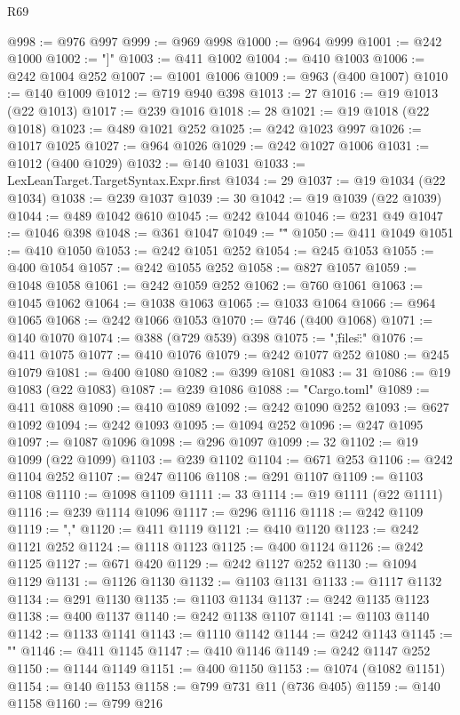 \begin{lexlean}{R69}
\begin{coremodule}
@998 := @976 @997
@999 := @969 @998
@1000 := @964 @999
@1001 := @242 @1000
@1002 := "]"
@1003 := @411 @1002
@1004 := @410 @1003
@1006 := @242 @1004 @252
@1007 := @1001 @1006
@1009 := @963 (@400 @1007)
@1010 := @140 @1009
@1012 := @719 @940 @398
@1013 := 27
@1016 := @19 @1013 (@22 @1013)
@1017 := @239 @1016
@1018 := 28
@1021 := @19 @1018 (@22 @1018)
@1023 := @489 @1021 @252
@1025 := @242 @1023 @997
@1026 := @1017 @1025
@1027 := @964 @1026
@1029 := @242 @1027 @1006
@1031 := @1012 (@400 @1029)
@1032 := @140 @1031
@1033 := LexLeanTarget.TargetSyntax.Expr.first
@1034 := 29
@1037 := @19 @1034 (@22 @1034)
@1038 := @239 @1037
@1039 := 30
@1042 := @19 @1039 (@22 @1039)
@1044 := @489 @1042 @610
@1045 := @242 @1044
@1046 := @231 @49
@1047 := @1046 @398
@1048 := @361 @1047
@1049 := "\""
@1050 := @411 @1049
@1051 := @410 @1050
@1053 := @242 @1051 @252
@1054 := @245 @1053
@1055 := @400 @1054
@1057 := @242 @1055 @252
@1058 := @827 @1057
@1059 := @1048 @1058
@1061 := @242 @1059 @252
@1062 := @760 @1061
@1063 := @1045 @1062
@1064 := @1038 @1063
@1065 := @1033 @1064
@1066 := @964 @1065
@1068 := @242 @1066 @1053
@1070 := @746 (@400 @1068)
@1071 := @140 @1070
@1074 := @388 (@729 @539) @398
@1075 := ",\"files\":{"
@1076 := @411 @1075
@1077 := @410 @1076
@1079 := @242 @1077 @252
@1080 := @245 @1079
@1081 := @400 @1080
@1082 := @399 @1081
@1083 := 31
@1086 := @19 @1083 (@22 @1083)
@1087 := @239 @1086
@1088 := "Cargo.toml"
@1089 := @411 @1088
@1090 := @410 @1089
@1092 := @242 @1090 @252
@1093 := @627 @1092
@1094 := @242 @1093
@1095 := @1094 @252
@1096 := @247 @1095
@1097 := @1087 @1096
@1098 := @296 @1097
@1099 := 32
@1102 := @19 @1099 (@22 @1099)
@1103 := @239 @1102
@1104 := @671 @253
@1106 := @242 @1104 @252
@1107 := @247 @1106
@1108 := @291 @1107
@1109 := @1103 @1108
@1110 := @1098 @1109
@1111 := 33
@1114 := @19 @1111 (@22 @1111)
@1116 := @239 @1114 @1096
@1117 := @296 @1116
@1118 := @242 @1109
@1119 := ","
@1120 := @411 @1119
@1121 := @410 @1120
@1123 := @242 @1121 @252
@1124 := @1118 @1123
@1125 := @400 @1124
@1126 := @242 @1125
@1127 := @671 @420
@1129 := @242 @1127 @252
@1130 := @1094 @1129
@1131 := @1126 @1130
@1132 := @1103 @1131
@1133 := @1117 @1132
@1134 := @291 @1130
@1135 := @1103 @1134
@1137 := @242 @1135 @1123
@1138 := @400 @1137
@1140 := @242 @1138 @1107
@1141 := @1103 @1140
@1142 := @1133 @1141
@1143 := @1110 @1142
@1144 := @242 @1143
@1145 := "}"
@1146 := @411 @1145
@1147 := @410 @1146
@1149 := @242 @1147 @252
@1150 := @1144 @1149
@1151 := @400 @1150
@1153 := @1074 (@1082 @1151)
@1154 := @140 @1153
@1158 := @799 @731 @11 (@736 @405)
@1159 := @140 @1158
@1160 := @799 @216

\end{coremodule}
\end{lexlean}
